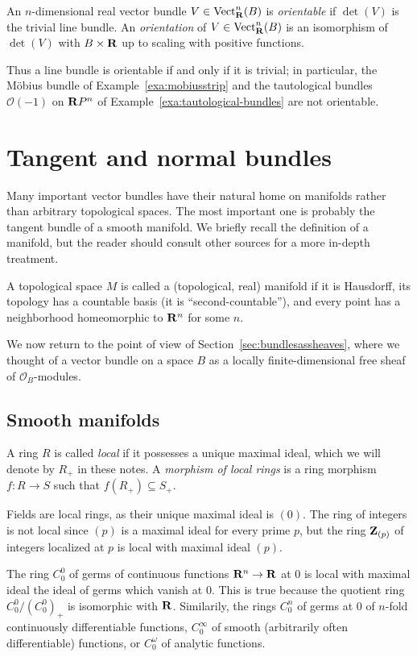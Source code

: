 \documentclass[a4paper,openany]{scrbook}
\DeclareMathOperator{\Vect}{Vect}
\begin{document}
\begin{defn}
An $n$-dimensional real vector bundle $V \in \Vect^n_\R(B)$ is \emph{orientable} if $\det(V)$ is the trivial line bundle. An \emph{orientation} of $V \in \Vect^n_\R(B)$ is an isomorphism of $\det(V)$ with $B \times \mathbf R$ up to scaling with positive functions.
\end{defn}

Thus a line bundle is orientable if and only if it is trivial; in particular, the Möbius bundle of Example~\ref{exa:mobiusstrip} and the tautological bundles $\mathcal O(-1)$ on $\mathbf R P^n$ of Example~\ref{exa:tautological-bundles} are not orientable.

\section{Tangent and normal bundles}

Many important vector bundles have their natural home on manifolds rather than arbitrary topological spaces. The most important one is probably the tangent bundle of a smooth manifold. We briefly recall the definition of a manifold, but the reader should consult other sources for a more in-depth treatment.

\begin{defn}
A topological space $M$ is called a (topological, real) manifold if it is Hausdorff, its topology has a countable basis (it is ``second-countable''), and every point has a neighborhood homeomorphic to $\mathbf R^n$ for some $n$.
\end{defn}

We now return to the point of view of Section~\ref{sec:bundlesassheaves}, where we thought of a vector bundle on a space $B$ as a locally finite-dimensional free sheaf of $\mathcal O_B$-modules.

\subsection{Smooth manifolds}\label{subsec:smooth-manifolds}

\begin{defn}
A ring $R$ is called \emph{local} if it possesses a unique maximal ideal, which we will denote by $R_+$ in these notes. A \emph{morphism of local rings} is a ring morphism $f\colon R \to S$ such that $f(R_+) \subseteq S_+$.
\end{defn}

\begin{example}
Fields are local rings, as their unique maximal ideal is $(0)$. The ring of integers is not local since $(p)$ is a maximal ideal for every prime $p$, but the ring $\mathbf Z_{(p)}$ of integers localized at $p$ is local with maximal ideal $(p)$. 

The ring $C^0_0$ of germs of continuous functions $\mathbf R^n \to \mathbf R$ at $0$ is local with maximal ideal the ideal of germs which vanish at $0$. This is true because the quotient ring $C^0_0/(C^0_0)_+$ is isomorphic with $\mathbf R$. Similarily, the rings $C^n_0$ of germs at $0$ of $n$-fold continuously differentiable functions, $C^\infty_0$ of smooth (arbitrarily often differentiable) functions, or $C^\omega_0$ of analytic functions.
\end{example}
\end{document}
